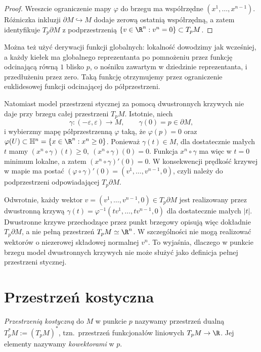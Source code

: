 \begin{proof}
Wreszcie ograniczenie mapy $\varphi$ do brzegu ma współrzędne
$(x^1,\ldots,x^{n-1})$. Różniczka inkluzji
$\partial M\hookrightarrow M$ dodaje zerową ostatnią współrzędną,
a zatem identyfikuje $T_p\partial M$ z podprzestrzenią $\{v\in\R^n:v^n=0\}\subset T_pM$.
\end{proof}

Można też użyć derywacji funkcji globalnych: lokalność dowodzimy
jak wcześniej, a każdy kiełek ma globalnego reprezentanta po
pomnożeniu przez funkcję odcinającą równą $1$ blisko $p$,
o nośniku zawartym w dziedzinie reprezentanta, i przedłużeniu przez zero.
Taką funkcję otrzymujemy przez ograniczenie
euklidesowej funkcji odcinającej do półprzestrzeni.

Natomiast model przestrzeni stycznej za pomocą dwustronnych krzywych
nie daje przy brzegu całej przestrzeni $T_pM$. Istotnie, niech
\[
\gamma:(-\varepsilon,\varepsilon)\to M,
\qquad
\gamma(0)=p\in\partial M,
\]
i wybierzmy mapę półprzestrzenną $\varphi$ taką, że
$\varphi(p)=0$ oraz $\varphi(U)\subset\mathbb H^n = \{x\in\R^n:x^n\geq0\}$.
Ponieważ $\gamma(t)\in M$, dla dostatecznie małych $t$ mamy $(x^n\circ\gamma)(t)\geq0, \ (x^n\circ\gamma)(0)=0$.
Funkcja $x^n\circ\gamma$ ma więc w $t=0$ minimum lokalne, a zatem $(x^n\circ\gamma)'(0)=0$.
W konsekwencji prędkość krzywej w mapie ma postać $(\varphi\circ\gamma)'(0) = (v^1,\ldots,v^{n-1},0)$,
czyli należy do podprzestrzeni odpowiadającej
$T_p\partial M$.

Odwrotnie, każdy wektor $v=(v^1,\ldots,v^{n-1},0)\in T_p\partial M$
jest realizowany przez dwustronną krzywą $\gamma(t) = \varphi^{-1}(tv^1,\ldots,tv^{n-1},0)$
dla dostatecznie małych $|t|$. Dwustronne krzywe przechodzące przez
punkt brzegowy opisują więc dokładnie $T_p\partial M$, a nie pełną
przestrzeń $T_pM\simeq\R^n$.
W szczególności nie mogą realizować wektorów o niezerowej składowej
normalnej $v^n$. To wyjaśnia, dlaczego w punkcie brzegu model
dwustronnych krzywych nie może służyć jako definicja pełnej przestrzeni
stycznej.

\section{Przestrzeń kostyczna}\label{sec:przestrzen-kostyczna}

\begin{definicja}
\emph{Przestrzenią kostyczną} do $M$ w punkcie $p$ nazywamy przestrzeń dualną
$T_p^*M:=(T_pM)^*$, tzn.\ przestrzeń funkcjonałów liniowych $T_pM\to\R$. Jej elementy
nazywamy \emph{kowektorami} w $p$.
\end{definicja}

